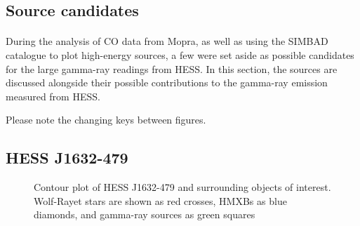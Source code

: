 \documentclass[a4paper, titlepage, oneside]{article}
\begin{document}
\begin{multicols}{2}
\section{Source candidates}
\paragraph{}
During the analysis of CO data from Mopra, as well as using the SIMBAD catalogue to plot high-energy sources, a few were set aside as possible candidates for the large gamma-ray readings from HESS. In this section, the sources are discussed alongside their possible contributions to the gamma-ray emission measured from HESS.

Please note the changing keys between figures.

\subsection{HESS J1632-479}

\begin{figure}[H]
  \centering
  \caption{Contour plot of HESS J1632-479 and surrounding objects of interest. Wolf-Rayet stars are shown as red crosses, HMXBs as blue diamonds, and gamma-ray sources as green squares}
  \label{fig:hess32}
\end{figure}


\end{multicols}
\end{document}
